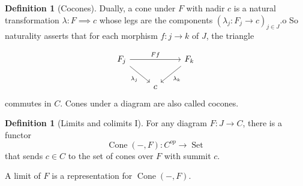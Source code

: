 \documentclass[reqno]{amsart}
\theoremstyle{definition}
\newtheorem{definition}[theorem]{Definition}
\theoremstyle{remark}
\DeclareMathOperator{\Set}{Set}
\DeclareMathOperator{\Cone}{Cone}
\begin{document}
    \begin{definition}[Cocones]
        Dually, a cone under $F$ with nadir $c$ is a natural
        transformation $\lambda \colon F \implies c$ whose
        legs are the components
        $\left( \lambda_j \colon F_j \to c \right)_{j 
        \in J}$.o
        So naturality asserts that for each
        morphism $f \colon j \to k$ of $J$, the triangle

        \begin{equation*}
        \begin{tikzcd}
            F_j \ar[rr, "Ff"] \ar[dr, "\lambda_j"'] & & F_k
            \ar[dl, "\lambda_k"] \\
                                                   & c &
        \end{tikzcd}
        \end{equation*}
       commutes in $C$. 
       Cones under a diagram are also called cocones.
    \end{definition}

    \begin{definition}[Limits and colimits I]
        For any diagram $F \colon J \to C$, there
        is a functor
        \[
        \Cone (-,F) \colon C^{op} \to \Set
        \] 
        that sends $c \in C$ to the
        set of cones over $F$ with
        summit $c$.

        A limit of $F$ is a representation
        for $\Cone \left( -,F \right) $.
    \end{definition}








\end{document}
